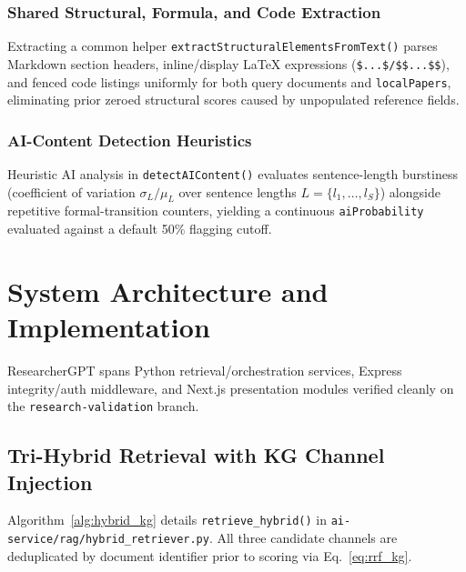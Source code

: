 \documentclass[conference]{IEEEtran}
\begin{document}
\subsubsection{Shared Structural, Formula, and Code Extraction}
Extracting a common helper \texttt{extractStructuralElementsFromText()} parses Markdown section headers, inline/display LaTeX expressions (\texttt{\$...\$/\$\$...\$\$}), and fenced code listings uniformly for both query documents and \texttt{localPapers}, eliminating prior zeroed structural scores caused by unpopulated reference fields.

\subsubsection{AI-Content Detection Heuristics}
Heuristic AI analysis in \texttt{detectAIContent()} evaluates sentence-length burstiness (coefficient of variation $\sigma_L / \mu_L$ over sentence lengths $L{=}\{l_1,\dots,l_S\}$) alongside repetitive formal-transition counters, yielding a continuous \texttt{aiProbability} evaluated against a default 50\% flagging cutoff.

\section{System Architecture and Implementation}
ResearcherGPT spans Python retrieval/orchestration services, Express integrity/auth middleware, and Next.js presentation modules verified cleanly on the \texttt{research-validation} branch.

\subsection{Tri-Hybrid Retrieval with KG Channel Injection}
Algorithm~\ref{alg:hybrid_kg} details \texttt{retrieve\_hybrid()} in \texttt{ai-service/rag/hybrid\_retriever.py}. All three candidate channels are deduplicated by document identifier prior to scoring via Eq.~\eqref{eq:rrf_kg}.
\end{document}
